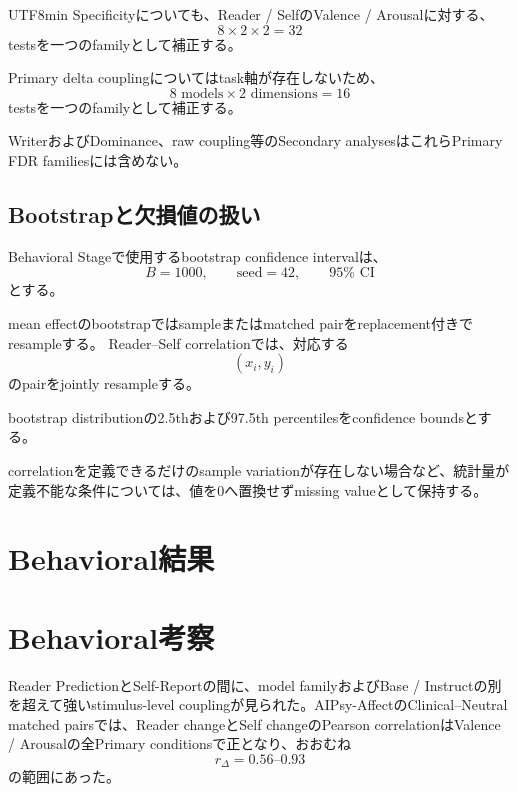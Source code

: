 \documentclass{article} %
\begin{document}
\begin{CJK*}{UTF8}{min}
Specificityについても、Reader / SelfのValence / Arousalに対する、
\[
8
\times
2
\times
2
=
32
\]
testsを一つのfamilyとして補正する。

Primary delta couplingについてはtask軸が存在しないため、
\[
8\text{ models}
\times
2\text{ dimensions}
=
16
\]
testsを一つのfamilyとして補正する。

WriterおよびDominance、raw coupling等のSecondary analysesはこれらPrimary FDR familiesには含めない。


\subsection{Bootstrapと欠損値の扱い}

Behavioral Stageで使用するbootstrap confidence intervalは、
\[
B=1000,
\qquad
\text{seed}=42,
\qquad
95\%\text{ CI}
\]
とする。

mean effectのbootstrapではsampleまたはmatched pairをreplacement付きでresampleする。
Reader--Self correlationでは、対応する
\[
(x_i,y_i)
\]
のpairをjointly resampleする。

bootstrap distributionの2.5thおよび97.5th percentilesをconfidence boundsとする。

correlationを定義できるだけのsample variationが存在しない場合など、統計量が定義不能な条件については、値を0へ置換せずmissing valueとして保持する。



\section{Behavioral結果}
\label{sec:behavioral-results}





\section{Behavioral考察}
\label{sec:behavioral-discussion}

Reader PredictionとSelf-Reportの間に、model familyおよびBase / Instructの別を超えて強いstimulus-level couplingが見られた。AIPsy-AffectのClinical--Neutral matched pairsでは、Reader changeとSelf changeのPearson correlationはValence / Arousalの全Primary conditionsで正となり、おおむね
\[
r_{\Delta}=0.56\text{--}0.93
\]
の範囲にあった。


\end{CJK*}
\end{document}
